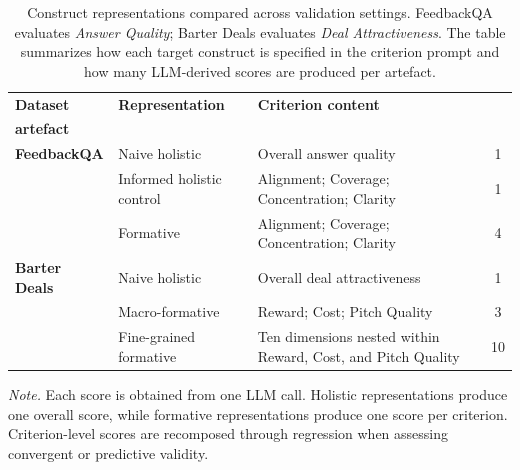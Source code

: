 \begin{table}[t]
\centering
\small
\caption{Construct representations compared across validation settings. FeedbackQA evaluates \textit{Answer Quality}; Barter Deals evaluates \textit{Deal Attractiveness}. The table summarizes how each target construct is specified in the criterion prompt and how many LLM-derived scores are produced per artefact.}
\label{tab:construct_representations}
\begin{tabularx}{\textwidth}{@{} 
    l 
    >{\raggedright\arraybackslash}p{3.8cm} 
    >{\raggedright\arraybackslash}X 
    c 
    @{}}
\toprule
\textbf{Dataset} & \textbf{Representation} & \textbf{Criterion content} & \begin{tabular}{@{}c@{}}\textbf{Scores /} \\ \textbf{artefact}\end{tabular} \\
\midrule
\textbf{FeedbackQA} 
& Naive holistic 
& Overall answer quality 
& 1 \\
\addlinespace
& Informed holistic control 
& Alignment; Coverage; Concentration; Clarity 
& 1 \\
\addlinespace
& Formative 
& Alignment; Coverage; Concentration; Clarity 
& 4 \\

\midrule

\textbf{Barter Deals} 
& Naive holistic 
& Overall deal attractiveness 
& 1 \\
\addlinespace
& Macro-formative 
& Reward; Cost; Pitch Quality 
& 3 \\
\addlinespace
& Fine-grained formative 
& Ten dimensions nested within Reward, Cost, and Pitch Quality 
& 10 \\
\bottomrule
\end{tabularx}

\vspace{0.15cm}
\begin{flushleft}
\footnotesize
\textit{Note.} Each score is obtained from one LLM call. Holistic representations produce one overall score, while formative representations produce one score per criterion. Criterion-level scores are recomposed through regression when assessing convergent or predictive validity.
\end{flushleft}
\end{table}




